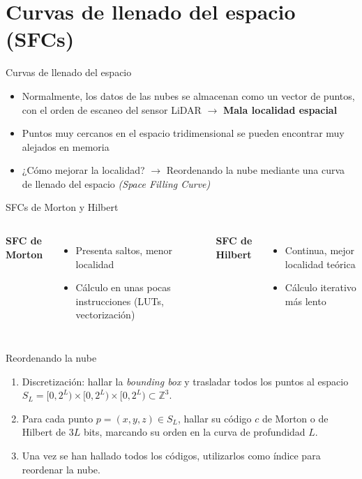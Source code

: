 \documentclass[aspectratio=169]{beamer}
\begin{document}
\section{Curvas de llenado del espacio (SFCs)}
\begin{frame}{Curvas de llenado del espacio}
    \begin{itemize}
        \item Normalmente, los datos de las nubes se almacenan como un vector de puntos, con el orden de escaneo del sensor LiDAR $\rightarrow$ \textbf{Mala localidad espacial} 
        \item Puntos muy cercanos en el espacio tridimensional se pueden encontrar muy alejados en memoria
        \item ¿Cómo mejorar la localidad? $\rightarrow$ Reordenando la nube mediante una curva de llenado del espacio \textit{(Space Filling Curve)}
    \end{itemize}
\end{frame}

\begin{frame}{SFCs de Morton y Hilbert}
    \begin{columns}
            \textbf{SFC de Morton}
            \begin{itemize}
                \item Presenta saltos, menor localidad
                \item Cálculo en unas pocas instrucciones (LUTs, vectorización)
            \end{itemize}
            \textbf{SFC de Hilbert}

            \begin{itemize}
                \item Continua, mejor localidad teórica
                \item Cálculo iterativo más lento
            \end{itemize}
        \end{columns}
\end{frame}

\begin{frame}{Reordenando la nube}
    \begin{enumerate}
        \item Discretización: hallar la \textit{bounding box} y trasladar todos los puntos al espacio $S_L = [0,2^L) \times [0, 2^L) \times [0, 2^L) \subset \mathbb{Z}^3$.
        \item Para cada punto $p =(x,y,z) \in S_L$, hallar su código $c$ de Morton o de Hilbert de $3L$ bits, marcando su orden en la curva de profundidad $L$.
        \item Una vez se han hallado todos los códigos, utilizarlos como índice para reordenar la nube.
    \end{enumerate}

\end{frame}
\end{document}
